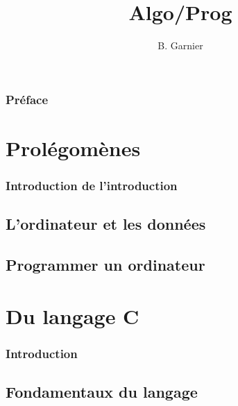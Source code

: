 \documentclass{minitelreport}
\begin{document}
	\title{Algo/Prog}
	\author{
		B. Garnier
	}
	\maketitle
\begin{refsection} %
\section*{Préface}

\tableofcontents
\listoftables
\listofdefinition
\newpage
\part{Prolégomènes}
\label{part:prol_gom_nes}
	\section*{Introduction de l'introduction}
	
	\chapter{L'ordinateur et les données}
	\label{cha:l_ordinateur_et_les_donn_es}
		
	\chapter{Programmer un ordinateur}
		\label{cha:programmer_un_ordinateur}
		
\part{Du langage C}
\label{part:du_langage_c}
	\section*{Introduction}
	
	\chapter{Fondamentaux du langage}
	\label{chap:fondamentaux_du_langage}
		

\end{refsection}
\end{document}
